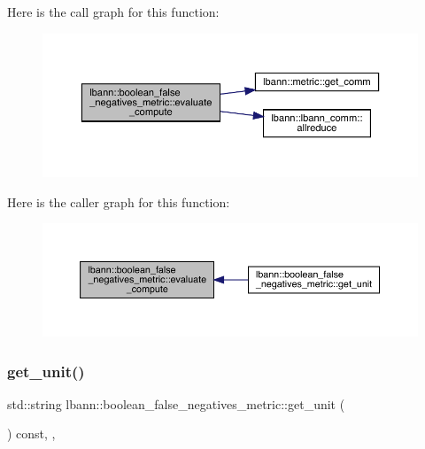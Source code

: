 Here is the call graph for this function\+:\nopagebreak
\begin{figure}[H]
\begin{center}
\leavevmode
\includegraphics[width=350pt]{classlbann_1_1boolean__false__negatives__metric_a598dfc1ee40c4e11f001cbf8899e0e0a_cgraph}
\end{center}
\end{figure}
Here is the caller graph for this function\+:\nopagebreak
\begin{figure}[H]
\begin{center}
\leavevmode
\includegraphics[width=350pt]{classlbann_1_1boolean__false__negatives__metric_a598dfc1ee40c4e11f001cbf8899e0e0a_icgraph}
\end{center}
\end{figure}
\mbox{\label{classlbann_1_1boolean__false__negatives__metric_abe2bdb0c15ff481caa234e13fe7df2b9}} 
\subsubsection{\texorpdfstring{get\+\_\+unit()}{get\_unit()}}
{\footnotesize\ttfamily std\+::string lbann\+::boolean\+\_\+false\+\_\+negatives\+\_\+metric\+::get\+\_\+unit (\begin{DoxyParamCaption}{ }\end{DoxyParamCaption}) const\hspace{0.3cm}{\ttfamily [inline]}, {\ttfamily [override]}, {\ttfamily [virtual]}}

